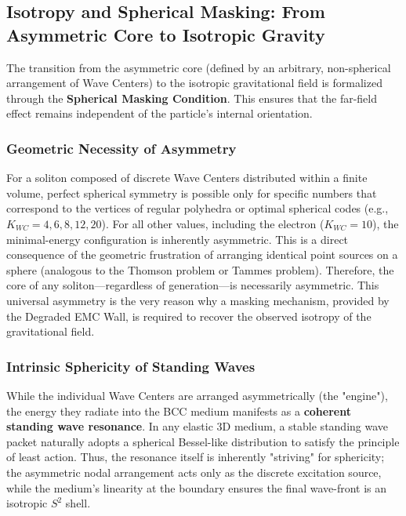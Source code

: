 \documentclass[10pt,a4paper]{article}
\begin{document}
\subsection{Isotropy and Spherical Masking: From Asymmetric Core to Isotropic Gravity}
\label{sec:spherical_masking}

The transition from the asymmetric core (defined by an arbitrary, non-spherical arrangement of Wave Centers) to the isotropic gravitational field is formalized through the \textbf{Spherical Masking Condition}. This ensures that the far-field effect remains independent of the particle's internal orientation.

\subsubsection{Geometric Necessity of Asymmetry}
\label{subsubsec:asymmetry_necessity}

For a soliton composed of  discrete Wave Centers  distributed within a finite volume, perfect spherical symmetry is possible only for specific numbers that correspond to the vertices of regular polyhedra or optimal spherical codes (e.g., $K_{WC} = 4, 6, 8, 12, 20$). For all other values, including the electron ($K_{WC}= 10$), the minimal-energy configuration is inherently asymmetric. This is a direct consequence of the geometric frustration of arranging identical point sources on a sphere (analogous to the Thomson problem or Tammes problem). Therefore, the core of any soliton—regardless of generation—is necessarily asymmetric. This universal asymmetry is the very reason why a masking mechanism, provided by the Degraded EMC Wall, is required to recover the observed isotropy of the gravitational field. %

\subsubsection{Intrinsic Sphericity of Standing Waves}
While the individual Wave Centers are arranged asymmetrically (the "engine"), the energy they radiate into the BCC medium manifests as a \textbf{coherent standing wave resonance}. In any elastic 3D medium, a stable standing wave packet naturally adopts a spherical Bessel-like distribution to satisfy the principle of least action. Thus, the resonance itself is inherently "striving" for sphericity; the asymmetric nodal arrangement acts only as the discrete excitation source, while the medium's linearity at the boundary ensures the final wave-front is an isotropic $S^2$ shell.
\end{document}
